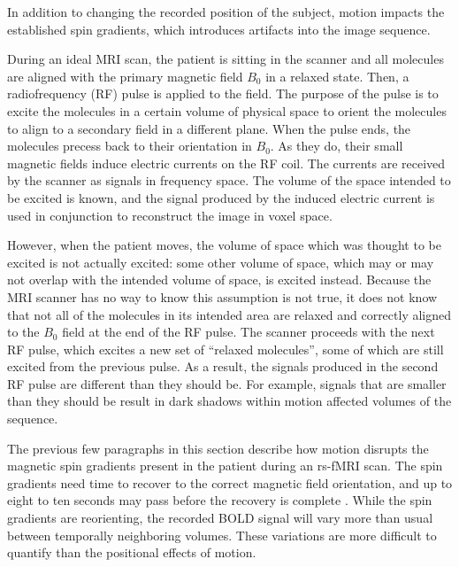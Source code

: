 In addition to changing the recorded position of the subject, motion impacts the established spin gradients, which introduces artifacts into the image sequence.


During an ideal MRI scan, the patient is sitting in the scanner and all molecules are aligned with the primary magnetic field $B_0$ in a relaxed state. Then, a radiofrequency (RF) pulse is applied to the field. The purpose of the pulse is to excite the molecules in a certain volume of physical space to orient the molecules to align to a secondary field in a different plane. When the pulse ends, the molecules precess back to their orientation in $B_0$. As they do, their small magnetic fields induce electric currents on the RF coil. The currents are received by the scanner as signals in frequency space. The volume of the space intended to be excited is known, and the signal produced by the induced electric current is used in conjunction to reconstruct the image in voxel space.

However, when the patient moves, the volume of space which was thought to be excited is not actually excited: some other volume of space, which may or may not overlap with the intended volume of space, is excited instead. Because the MRI scanner has no way to know this assumption is not true, it does not know that not all of the molecules in its intended area are relaxed and correctly aligned to the $B_0$ field at the end of the RF pulse. The scanner proceeds with the next RF pulse, which excites a new set of ``relaxed molecules'', some of which are still excited from the previous pulse. As a result, the signals produced in the second RF pulse are different than they should be. For example, signals that are smaller than they should be result in dark shadows within motion affected volumes of the sequence.

The previous few paragraphs in this section describe how motion disrupts the magnetic spin gradients present in the patient during an rs-fMRI scan. The spin gradients need time to recover to the correct magnetic field orientation, and up to eight to ten seconds may pass before the recovery is complete \cite{Power2014}. While the spin gradients are reorienting, the recorded BOLD signal will vary more than usual between temporally neighboring volumes. These variations are more difficult to quantify than the positional effects of motion.

